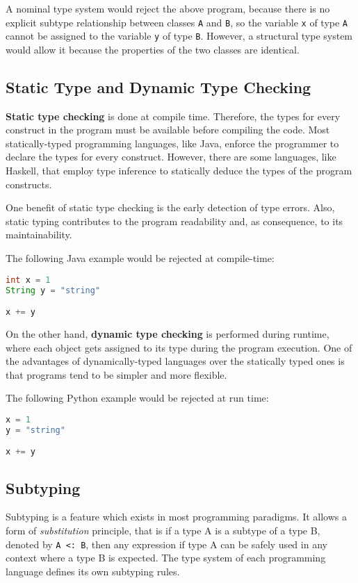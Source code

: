 A nominal type system would reject the above program, because there is no explicit subtype relationship between classes \lstinline|A| and \lstinline|B|, so the variable \lstinline|x| of type \lstinline|A| cannot be assigned to the variable \lstinline|y| of type \lstinline|B|. However, a structural type system would allow it because the properties of the two classes are identical.

\subsection{Static Type and Dynamic Type Checking}

\textbf{Static type checking} is done at compile time. Therefore, the types for every construct in the program must be available before compiling the code. Most statically-typed programming languages, like Java, enforce the programmer to declare the types for every construct. However, there are some languages, like Haskell, that employ type inference to statically deduce the types of the program constructs.

One benefit of static type checking is the early detection of type errors. Also, static typing contributes to the program readability and, as consequence, to its maintainability.

The following Java example would be rejected at compile-time:
\begin{lstlisting}[language=java]
int x = 1
String y = "string"

x += y
\end{lstlisting}

On the other hand, \textbf{dynamic type checking} is performed during runtime, where each object gets assigned to its type during the program execution. One of the advantages of dynamically-typed languages over the statically typed ones is that programs tend to be simpler and more flexible.

The following Python example would be rejected at run time:
\begin{lstlisting}[language=python]
x = 1
y = "string"

x += y
\end{lstlisting}

\subsection{Subtyping}
Subtyping is a feature which exists in most programming paradigms. It allows a form of \textit{substitution} principle, that is if a type A is a subtype of a type B, denoted by \lstinline|A <: B|, then any expression if type A can be safely used in any context where a type B is expected. The type system of each programming language defines its own subtyping rules.

